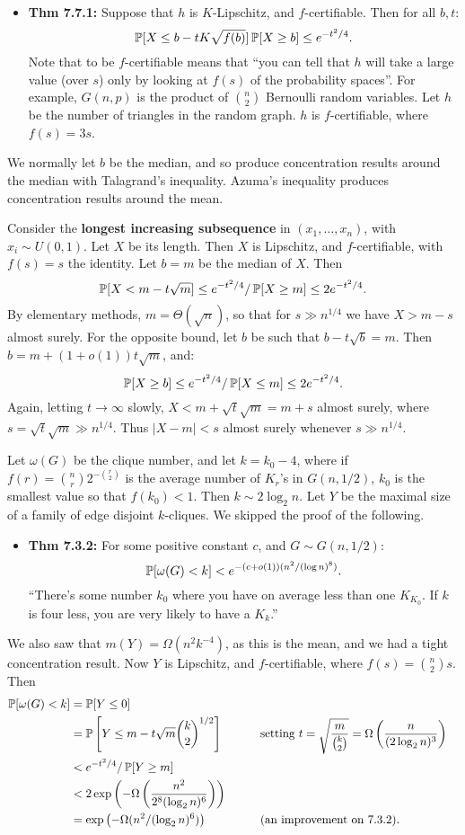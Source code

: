 \documentclass[11pt]{article}
\newenvironment{INT}[1][]{\begin{itemize}\small\item\textbf{#1}}{\end{itemize}}
\begin{document}
\begin{INT}[Thm 7.7.1:]
Suppose that $h$ is $K$-Lipschitz, and $f$-certifiable. Then for all $b,t$:
\[\operatorname{\mathbb{P}}[X\leq b-tK\sqrt{f(b)}]\operatorname{\mathbb{P}}[X\geq b]\leq e^{-t^2/4}.\]
Note that to be $f$-certifiable means that ``you can tell that $h$ will take a large value (over $s$) only by looking at $f(s)$ of the probability spaces''. For example, $G(n,p)$ is the product of ${n\choose2}$ Bernoulli random variables. Let $h$ be the number of triangles in the random graph. $h$ is $f$-certifiable, where $f(s)=3s$.
\end{INT}
We normally let $b$ be the median, and so produce concentration results around the median with Talagrand's inequality. Azuma's inequality produces concentration results around the mean.
\begin{itemise}
\item Consider the \textbf{longest increasing subsequence} in $(x_1,\ldots,x_n)$, with $x_i\sim U(0,1)$. Let $X$ be its length. Then $X$ is Lipschitz, and $f$-certifiable, with $f(s)=s$ the identity. Let $b=m$ be the median of $X$. Then
\[\operatorname{\mathbb{P}}[X<m-t\sqrt m]\leq e^{-t^2/4}/\operatorname{\mathbb{P}}[X\geq m]\leq 2e^{-t^2/4}.\]
By elementary methods, $m=\Theta(\sqrt n)$, so that for $s\gg n^{1/4}$ we have $X>m-s$ almost surely. For the opposite bound, let $b$ be such that $b-t\sqrt b=m$. Then $b=m+(1+o(1))t\sqrt m$, and:
\[\operatorname{\mathbb{P}}[X\geq b]\leq e^{-t^2/4}/\operatorname{\mathbb{P}}[X\leq m]\leq 2e^{-t^2/4}.\]
Again, letting $t\rightarrow\infty$ slowly, $X<m+\sqrt t\sqrt m=m+s$ almost surely, where $s=\sqrt t\sqrt m \gg n^{1/4}$. Thus $|X-m|<s$ almost surely whenever $s\gg n^{1/4}$.
\item  Let $\omega(G)$ be the clique number, and let $k=k_0-4$, where if $f(r)={n\choose r}2^{-{r\choose2}}$ is the average number of $K_r$'s in $G(n,1/2)$, $k_0$ is the smallest value so that $f(k_0)<1$. Then $k\sim 2\log_2n$. Let $Y$ be the maximal size of a family of edge disjoint $k$-cliques. We skipped the proof of the following.
\begin{INT}[Thm 7.3.2:]
For some positive constant $c$, and $G\sim G(n,1/2)$:
\[\operatorname{\mathbb{P}}[\omega(G)<k]<e^{-(c+o(1))(n^2/(\log n)^8)}.\]
``There's some number $k_0$ where you have on average less than one $K_{K_0}$. If $k$ is four less, you are very likely to have a $K_k$.''
\end{INT}
We also saw that $m(Y)=\Omega(n^2k^{-4})$, as this is the mean, and we had a tight concentration result. Now $Y$ is Lipschitz, and $f$-certifiable, where $f(s)={n\choose2}s$. Then
\begin{alignat*}{2}
\Prob[\omega(G)<k]&=\Prob[Y\leq 0]%
\\&=\Prob\left[Y\leq m-t\sqrt m{k\choose 2}^{1/2}\right]&\qquad&\text{setting $t=\sqrt {\frac{m}{{k\choose2}}}=\Omega\left(\frac{n}{(2\log_2n)^3}\right)$}
\\&<e^{-t^2/4}/\Prob[Y\geq m]%
\\&<2\exp\left(-\Omega\left(\frac{n^2}{2^8(\log_2n)^6}\right)\right)%
\\&=\exp\left(-\Omega(n^2/(\log_2n)^6)\right)&\qquad&\text{(an improvement on 7.3.2).}
\end{alignat*}
\end{itemise}
\end{document}
